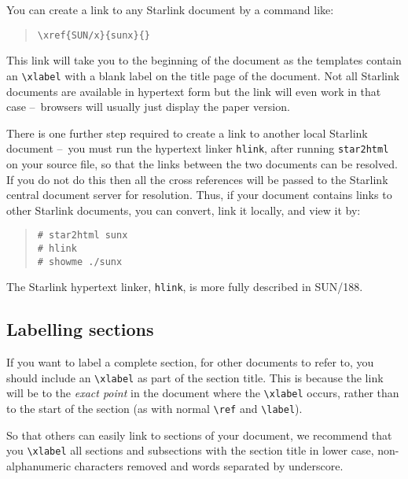 \documentclass[twoside,11pt]{article}
\newcommand{\xref}[3]{#1}
\newcommand{\xlabel}[1]{}
\renewcommand{\_}{\texttt{\symbol{95}}}
\newcommand{\dash}{--}
\newcommand{\dash}{-}
\begin{document}
You can create a link to any Starlink document by a command like:

\begin{quote}
\begin{verbatim}
\xref{SUN/x}{sunx}{}
\end{verbatim}
\end{quote}

This link will take you to the beginning of the document as the templates
contain an \verb#\xlabel# with a blank label on the title page of the document.
Not all Starlink documents are available in hypertext form but the link will
even work in that case \dash\  browsers will usually just display the paper
version.

There is one further step required to create a link to another local 
Starlink document \dash\ you must run the hypertext linker \texttt{hlink},
after running \texttt{star2html} on your source file, so that the links
between the two documents can be resolved. If you do not do this then all the
cross references will be passed to the Starlink central document server for
resolution. 
Thus, if your document contains links to other Starlink documents, you
can convert, link it locally, and view it by:

\begin{quote}
\begin{verbatim}
# star2html sunx
# hlink
# showme ./sunx
\end{verbatim}
\end{quote}

The Starlink hypertext linker, \texttt{hlink}, is more fully described in
\xref{SUN/188}{sun188}{}.

\subsection{\xlabel{labelling_sections}\label{labelling_sections}Labelling sections}

If you want to label a complete section, for other documents to refer to,
you should include an \verb+\xlabel+ as part of the section title.
This is because the link will be to the \emph{exact point}\/ in the document
where the \verb#\xlabel# occurs, rather than to the start of the
section (as with normal \verb#\ref# and \verb#\label#).

So that others can easily link to sections of your document,
we recommend that you \verb+\xlabel+ all sections and subsections
with the section title in lower case, non-alphanumeric characters removed and
words separated by underscore.
\end{document}
